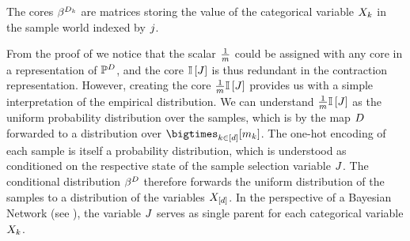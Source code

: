 The cores $\beta^{D_{k}}$ are matrices storing the value of the categorical variable $X_{k}$ in the sample world indexed by $j$.

From the proof of  we notice that the scalar $\frac{1}{m}$ could be assigned with any core in a representation of $\mathbb{P}^{D}$, and the core $\mathbb{I}\left[J\right]$ is thus redundant in the contraction representation.
However, creating the core $\frac{1}{m}\mathbb{I}\left[J\right]$ provides us with a simple interpretation of the empirical distribution.
We can understand $\frac{1}{m}\mathbb{I}\left[J\right]$ as the uniform probability distribution over the samples, which is by the map $D$ forwarded to a distribution over $\facstates$.
The one-hot encoding of each sample is itself a probability distribution, which is understood as conditioned on the respective state of the sample selection variable $J$.
The conditional distribution $\beta^{D}$ therefore forwards the uniform distribution of the samples to a distribution of the variables $X_{[d]}$.
In the perspective of a Bayesian Network (see ), the variable $J$ serves as single parent for each categorical variable $X_{k}$.





